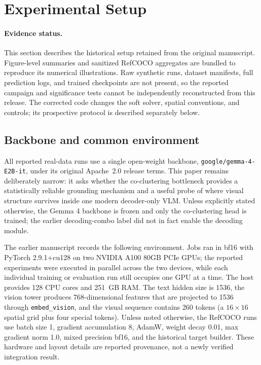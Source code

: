 \documentclass[11pt,a4paper]{article}
\begin{document}
\section{Experimental Setup}
\paragraph{Evidence status.}
This section describes the historical setup retained from the original manuscript. Figure-level summaries and sanitized RefCOCO aggregates are bundled to reproduce its numerical illustrations. Raw synthetic runs, dataset manifests, full prediction logs, and trained checkpoints are not present, so the reported campaign and significance tests cannot be independently reconstructed from this release. The corrected code changes the soft solver, spatial conventions, and controls; its prospective protocol is described separately below.
\label{sec:setup}

\subsection{Backbone and common environment}

All reported real-data runs use a single open-weight backbone, \texttt{google/gemma-4-E2B-it}, under its original Apache~2.0 release terms. This paper remains deliberately narrow: it asks whether the co-clustering bottleneck provides a statistically reliable grounding mechanism and a useful probe of where visual structure survives inside one modern decoder-only VLM. Unless explicitly stated otherwise, the Gemma 4 backbone is frozen and only the co-clustering head is trained; the earlier decoding-combo label did not in fact enable the decoding module.

The earlier manuscript records the following environment. Jobs ran in bf16 with PyTorch 2.9.1+cu128 on two NVIDIA A100 80GB PCIe GPUs; the reported experiments were executed in parallel across the two devices, while each individual training or evaluation run still occupies one GPU at a time. The host provides 128 CPU cores and 251~GB RAM. The text hidden size is 1536, the vision tower produces 768-dimensional features that are projected to 1536 through \texttt{embed\_vision}, and the visual sequence contains 260 tokens (a $16\times16$ spatial grid plus four special tokens). Unless noted otherwise, the RefCOCO runs use batch size 1, gradient accumulation 8, AdamW, weight decay 0.01, max gradient norm 1.0, mixed precision bf16, and the historical target builder. These hardware and layout details are reported provenance, not a newly verified integration result.
\end{document}
